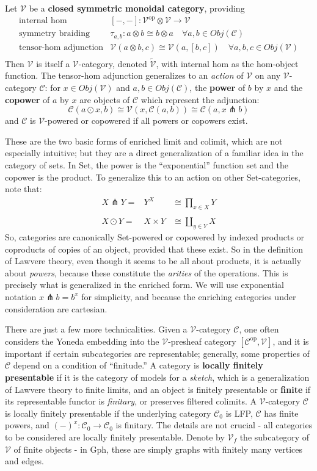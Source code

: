 \documentclass[a4paper,UKenglish]{article}
\theoremstyle{definition}
\newcommand{\Gph}{\mathrm{Gph}}
\newcommand{\Set}{\mathrm{Set}}
\newcommand{\op}{\mathrm{op}}
\newcommand{\V}{\mathscr{V}}
\newcommand{\C}{\mathscr{C}}
\newcommand{\pfk}{\pitchfork}
\begin{document}
Let $\V$ be a \textbf{closed symmetric monoidal category}, providing
\[\begin{array}{rl}
\text{internal hom} & [-,-]:\V^\op\otimes \V \to \V\\
\text{symmetry braiding} & \tau_{a,b}:a\otimes b\cong b\otimes a \quad \forall a,b \in Obj(\C)\\
\text{tensor-hom adjunction} & \V(a\otimes b,c) \cong \V(a,[b,c]) \quad \forall a,b,c \in Obj(\V)\\
\end{array}\]
Then $\V$ is itself a $\V$-category, denoted $\tilde{\V}$, with internal hom as the hom-object function. The tensor-hom adjunction generalizes to an \textit{action} of $\V$ on any $\V$-category $\C$: for $x \in Obj(\V)$ and $a,b \in Obj(\C)$, the \textbf{power} of $b$ by $x$ and the \textbf{copower} of $a$ by $x$ are objects of $\C$ which represent the adjunction:
$$\C(a\odot x,b) \cong \V(x, \C(a,b)) \cong \C(a,x\pfk b)$$
and $\C$ is $\V$-powered or copowered if all powers or copowers exist.

These are the two basic forms of enriched limit and colimit, which are not especially intuitive; but they are a direct generalization of a familiar idea in the category of sets. In $\Set$, the power is the ``exponential'' function set and the copower is the product. To generalize this to an action on other $\Set$-categories, note that:
\[\begin{array}{lcr}
	X \pfk Y = & Y^X & \cong \prod_{x\in X}Y\\
	\\
	X \odot Y = & X \times Y & \cong \coprod_{y\in Y}X
\end{array}\]
So, categories are canonically $\Set$-powered or copowered by indexed products or coproducts of copies of an object, provided that these exist. So in the definition of Lawvere theory, even though it seems to be all about products, it is actually about \textit{powers}, because these constitute the \textit{arities} of the operations. This is precisely what is generalized in the enriched form. We will use exponential notation $x\pfk b = b^x$ for simplicity, and because the enriching categories under consideration are cartesian.

There are just a few more technicalities. Given a $\V$-category $\C$, one often considers the Yoneda embedding into the $\V$-presheaf category $[\C^\op, \V]$, and it is important if certain subcategories are representable; generally, some properties of $\C$ depend on a condition of ``finitude.'' \cite{finite} A category is \textbf{locally finitely presentable} if it is the category of models for a \textit{sketch}, which is a generalization of Lawvere theory to finite limits, and an object is finitely presentable or \textbf{finite} if its representable functor is \textit{finitary}, or preserves filtered colimits. A $\V$-category $\C$ is locally finitely presentable if the underlying category $\C_0$ is LFP, $\C$ has finite powers, and $(-)^x: \C_0 \to \C_0$ is finitary. The details are not crucial - all categories to be considered are locally finitely presentable. Denote by $\V_f$ the subcategory of $\V$ of finite objects - in $\Gph$, these are simply graphs with finitely many vertices and edges.
\end{document}

